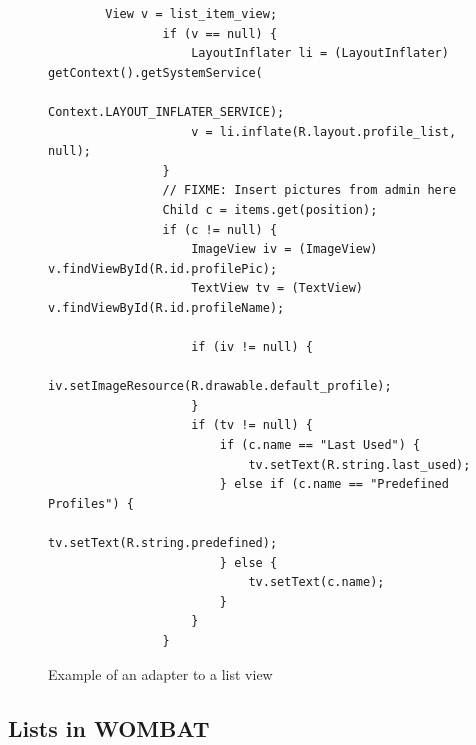 \begin{figure}[H]
	\centering
		\begin{verbatim}
		View v = list_item_view;
				if (v == null) {
					LayoutInflater li = (LayoutInflater) getContext().getSystemService(
							Context.LAYOUT_INFLATER_SERVICE);
					v = li.inflate(R.layout.profile_list, null);
				}
				// FIXME: Insert pictures from admin here
				Child c = items.get(position);
				if (c != null) {
					ImageView iv = (ImageView) v.findViewById(R.id.profilePic);
					TextView tv = (TextView) v.findViewById(R.id.profileName);

					if (iv != null) {
						iv.setImageResource(R.drawable.default_profile);
					}
					if (tv != null) {
						if (c.name == "Last Used") {
							tv.setText(R.string.last_used);
						} else if (c.name == "Predefined Profiles") {
							tv.setText(R.string.predefined);
						} else {
							tv.setText(c.name);
						}
					}
				}
		\end{verbatim}
	\caption{Example of an adapter to a list view}%
	\label{code:listview_adapter_example}%
\end{figure}



\subsection{Lists in WOMBAT}
